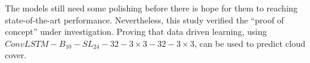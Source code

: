 The models still need some polishing before there is hope for them to reaching state-of-the-art performance. Nevertheless, this study verified the ``proof of concept'' under investigation. Proving that data driven learning, using $ConvLSTM-B_{10}-SL_{24}-32-3\times3-32-3 \times3$, can be used to predict cloud cover.

\cleardoublepage